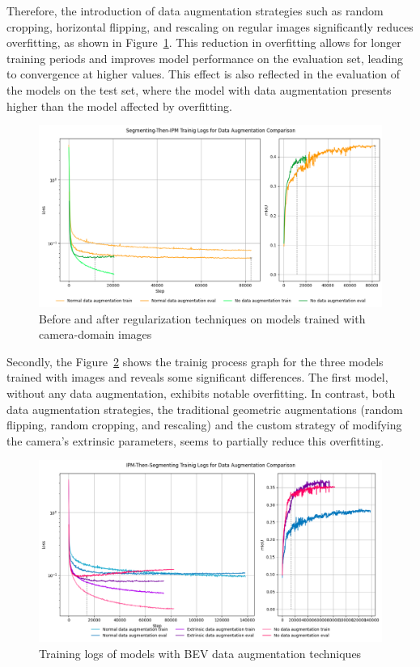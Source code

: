 Therefore, the introduction of data augmentation strategies such as random cropping, horizontal flipping, and rescaling on regular images significantly reduces overfitting, as shown in Figure~\ref{fig:normal_before_after_data_aug_logs}. This reduction in overfitting allows for longer training periods and improves model performance on the evaluation set, leading to convergence at higher  values. This effect is also reflected in the evaluation of the models on the test set, where the model with data augmentation presents higher  than the model affected by overfitting.

\begin{figure}[!ht]
    \centering
    \includegraphics[width=0.7\linewidth]{./images/experiments/nor_before_after_data_aug_logs.png}
    \caption{Before and after regularization techniques on models trained with camera-domain images}
    \label{fig:normal_before_after_data_aug_logs}
\end{figure}

Secondly, the Figure~\ref{fig:bev_before_after_data_aug_logs} shows the trainig process graph for the three models trained with  images and reveals some significant differences. The first model, without any data augmentation, exhibits notable overfitting. In contrast, both data augmentation strategies, the traditional geometric augmentations (random flipping, random cropping, and rescaling) and the custom strategy of modifying the camera's extrinsic parameters, seems to partially reduce this overfitting.

\begin{figure}[!ht]
    \centering
    \includegraphics[width=0.7\linewidth]{./images/experiments/bev_before_after_data_aug_logs.png}
    \caption{Training logs of models with BEV data augmentation techniques}
    \label{fig:bev_before_after_data_aug_logs}
\end{figure}

